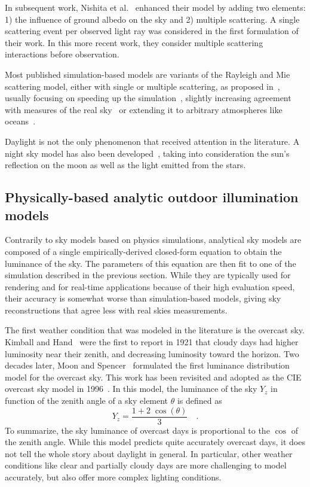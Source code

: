 In subsequent work, Nishita et al.~\cite{nishita1996display} enhanced their model by adding two elements: 1) the influence of ground albedo on the sky and 2) multiple scattering. A single scattering event per observed light ray was considered in the first formulation of their work. In this more recent work, they consider multiple scattering interactions before observation.

Most published simulation-based models are variants of the Rayleigh and Mie scattering model, either with single or multiple scattering, as proposed in~\cite{nishita1993display,nishita1996display}, usually focusing on speeding up the simulation~\cite{oneal2005accurate}, slightly increasing agreement with measures of the real sky~\cite{haber2005physically,bruneton2008precomputed} or extending it to arbitrary atmospheres like oceans~\cite{elek2010real}.

Daylight is not the only phenomenon that received attention in the literature. A night sky model has also been developed~\cite{jensen2001nightskymodel}, taking into consideration the sun's reflection on the moon as well as the light emitted from the stars.

\subsection{Physically-based analytic outdoor illumination models}

Contrarily to sky models based on physics simulations, analytical sky models are composed of a single empirically-derived closed-form equation to obtain the luminance of the sky. The parameters of this equation are then fit to one of the simulation described in the previous section. While they are typically used for rendering and for real-time applications because of their high evaluation speed, their accuracy is somewhat worse than simulation-based models, giving sky reconstructions that agree less with real skies measurements.

The first weather condition that was modeled in the literature is the overcast sky. Kimball and Hand~\cite{kimball1921sky} were the first to report in 1921 that cloudy days had higher luminosity near their zenith, and decreasing luminosity toward the horizon. Two decades later, Moon and Spencer~\cite{moon1942illumination} formulated the first luminance distribution model for the overcast sky. This work has been revisited and adopted as the CIE overcast sky model in 1996~\cite{cie1996s}. In this model, the luminance of the sky $Y_z$ in function of the zenith angle of a sky element $\theta$ is defined as
\begin{equation}
Y_z = \frac{1 + 2 \; \cos\left( \theta \right)}{3} \quad.
\end{equation}
To summarize, the sky luminance of overcast days is proportional to the $\cos$ of the zenith angle. While this model predicts quite accurately overcast days, it does not tell the whole story about daylight in general. In particular, other weather conditions like clear and partially cloudy days are more challenging to model accurately, but also offer more complex lighting conditions.

